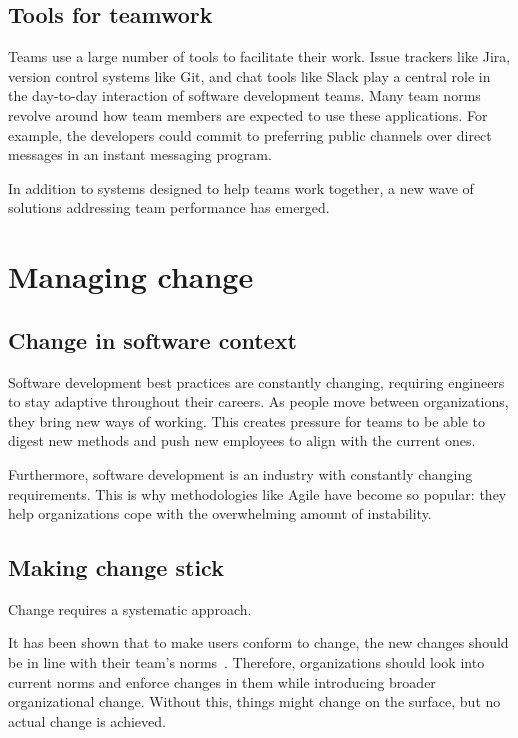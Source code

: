 \subsection{Tools for teamwork}

Teams use a large number of tools to facilitate their work. Issue trackers like Jira, version control systems like Git, and chat tools like Slack play a central role in the day-to-day interaction of software development teams. Many team norms revolve around how team members are expected to use these applications. For example, the developers could commit to preferring public channels over direct messages in an instant messaging program.

In addition to systems designed to help teams work together, a new wave of solutions addressing team performance has emerged. 


\section{Managing change}

\subsection{Change in software context}

Software development best practices are constantly changing, requiring engineers to stay adaptive throughout their careers. As people move between organizations, they bring new ways of working. This creates pressure for teams to be able to digest new methods and push new employees to align with the current ones. 

Furthermore, software development is an industry with constantly changing requirements. This is why methodologies like Agile have become so popular: they help organizations cope with the overwhelming amount of instability. 

\subsection{Making change stick}

Change requires a systematic approach. 

It has been shown that to make users conform to change, the new changes should be in line with their team's norms~\cite{terry_attitude-behaviour_2000}. Therefore, organizations should look into current norms and enforce changes in them while introducing broader organizational change. Without this, things might change on the surface, but no actual change is achieved.

